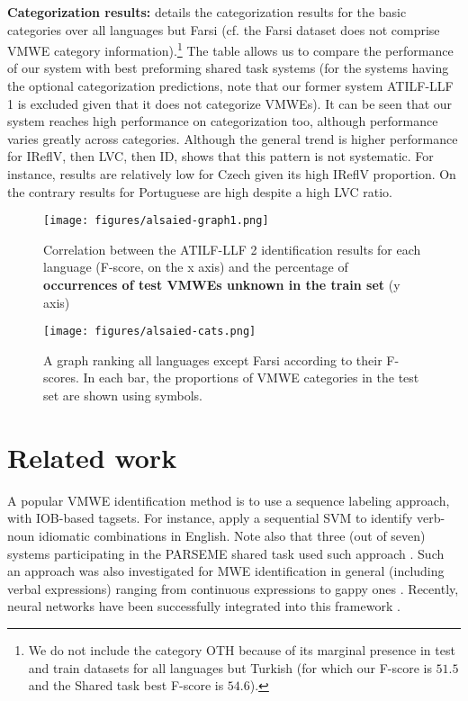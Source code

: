 \documentclass[output=paper,modfonts]{langscibook}
\begin{document}
\textbf{Categorization results: } details the categorization results for the basic categories over all languages but Farsi (cf. the Farsi dataset does not comprise VMWE category information).\footnote{We do not include the category OTH because of its marginal presence in test and train datasets for all languages but Turkish (for which our F-score is $51.5$ and the Shared task best F-score is $54.6$).} The table allows us to compare the performance of our system with  best preforming shared task systems (for the systems having the optional categorization predictions, note that our former system ATILF-LLF 1 is excluded given that it does not categorize VMWEs). It can be seen that our system reaches high performance on categorization too, although performance varies greatly across categories. Although the general trend is higher performance for IReflV, then LVC, then ID,  shows that this pattern is not systematic. For instance, results are relatively low for Czech given its high IReflV proportion. On the contrary results for Portuguese are high despite a high LVC ratio.
\begin{figure}[H]
\texttt{[image: figures/alsaied-graph1.png]}
\caption{Correlation between the ATILF-LLF 2 identification results for each language (F-score, on the x axis) and the percentage of \textbf{occurrences of test VMWEs unknown in the train set} (y axis)}
\label{fig:correlation}
\end{figure}
\begin{figure}[H]
\texttt{[image: figures/alsaied-cats.png]}
\caption{A graph ranking all languages except Farsi according to their F-scores. In each bar, the proportions of VMWE categories in the test set are shown using symbols.}
\label{fig:cats}
\end{figure}
\section{Related work}
A popular VMWE identification method is to use a sequence labeling approach, with IOB-based tagsets. For instance, \citet{diab-bhutada:2009:MWE09} apply a sequential SVM to identify verb-noun idiomatic combinations in English. Note also that three (out of seven) systems participating in the PARSEME shared task used such approach \citep{borocs2017,maldonado2017,W17-1707}.
Such an approach was also investigated for MWE identification in general (including verbal expressions) ranging from continuous expressions \citep{blunsom-baldwin:2006:EMNLP} to gappy ones \citep{Schneider14b}. Recently, neural networks have been successfully integrated into this framework \citep{legrand2016phrase,W17-1707}. 
\end{document}
